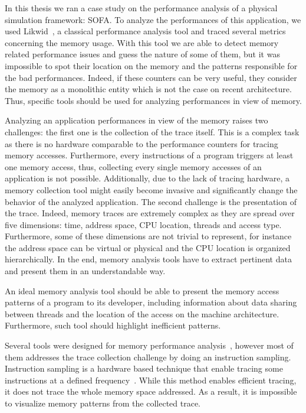 In this thesis we ran a case study on the performance analysis of a physical simulation framework: \gls{SOFA}.
To analyze the performances of this application, we used \gls{Likwid}~\cite{Treibig10LIKWID}, a classical performance analysis tool and traced several metrics concerning the memory usage.
With this tool we are able to detect memory related performance issues and guess the nature of some of them, but it was impossible to spot their location on the memory and the patterns responsible for the bad performances.
Indeed, if these counters can be very useful, they consider the memory as a monolithic entity which is not the case on recent architecture.
Thus, specific tools should be used for analyzing performances in view of memory.

Analyzing an application performances in view of the memory raises two challenges: the first one is the collection of the trace itself.
This is a complex task as there is no hardware comparable to the performance counters for tracing memory accesses.
Furthermore, every instructions of a program triggers at least one memory access, thus, collecting every single memory accesses of an application is not possible.
Additionally, due to the lack of tracing hardware, a memory collection tool might easily become invasive and significantly change the behavior of the analyzed application.
The second challenge is the presentation of the trace.
Indeed, memory traces are extremely complex as they are spread over five dimensions: time, address space, \gls{CPU} location, threads and access type.
Furthermore, some of these dimensions are not trivial to represent, for instance the address space can be virtual or physical and the \gls{CPU} location is organized hierarchically.
In the end, memory analysis tools have to extract pertinent data and present them in an understandable way.

An ideal memory analysis tool should be able to present the memory access patterns of a program to its developer, including information about data sharing between threads and the location of the access on the machine architecture.
Furthermore, such tool should highlight inefficient patterns.

Several tools were designed for memory performance analysis~\cite{Lachaize12MemProf,Liu14Tool,Gimenez14Dissecting}, however most of them addresses the trace collection challenge by doing an instruction sampling.
Instruction sampling is a hardware based technique that enable tracing some instructions at a defined frequency~\cite{Drongowski07Instructionbased,Levinthal09Performance}.
While this method enables efficient tracing, it does not trace the whole memory space addressed.
As a result, it is impossible to visualize memory patterns from the collected trace.

